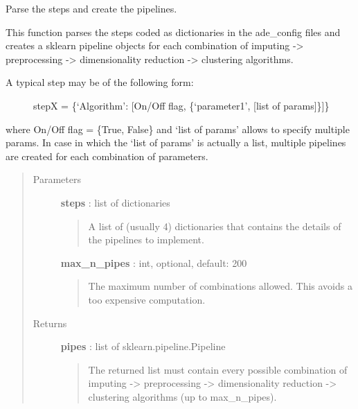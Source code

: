 \documentclass[letterpaper,10pt,english]{sphinxmanual}
\begin{document}
\begin{fulllineitems}
\label{index:adenine.core.define_pipeline.parse_steps}
Parse the steps and create the pipelines.

This function parses the steps coded as dictionaries in the ade\_config
files and creates a sklearn pipeline objects for each combination of
imputing -\textgreater{} preprocessing -\textgreater{} dimensionality reduction -\textgreater{} clustering
algorithms.
\begin{description}
\item[{A typical step may be of the following form:}] \leavevmode
stepX = \{`Algorithm': {[}On/Off flag, \{`parameter1', {[}list of params{]}\}{]}\}

\end{description}

where On/Off flag = \{True, False\} and `list of params' allows to specify
multiple params. In case in which the `list of params' is actually a list,
multiple pipelines are created for each combination of parameters.
\begin{quote}\begin{description}
\item[{Parameters}] \leavevmode
\textbf{steps} : list of dictionaries
\begin{quote}

A list of (usually 4) dictionaries that contains the details of the
pipelines to implement.
\end{quote}

\textbf{max\_n\_pipes} : int, optional, default: 200
\begin{quote}

The maximum number of combinations allowed. This avoids a too expensive
computation.
\end{quote}

\item[{Returns}] \leavevmode
\textbf{pipes} : list of sklearn.pipeline.Pipeline
\begin{quote}

The returned list must contain every possible combination of
imputing -\textgreater{} preprocessing -\textgreater{} dimensionality reduction -\textgreater{} clustering
algorithms (up to max\_n\_pipes).
\end{quote}

\end{description}\end{quote}

\end{fulllineitems}
\end{document}
